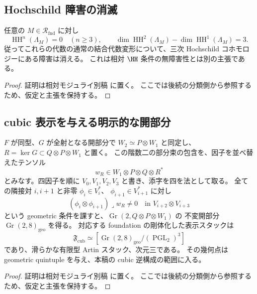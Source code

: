 \subsection{Hochschild 障害の消滅}

\begin{proposition}
\label{prop:foundation-hochschild}
任意の $M\in\mathcal R_{\mathrm{fnd}}$ に対し
\[
 \operatorname{HH}^n(\Lambda_M)=0\quad(n\ge3),\qquad
 \dim\operatorname{HH}^2(\Lambda_M)
 -\dim\operatorname{HH}^1(\Lambda_M)=3.
\]
従ってこれらの代数の通常の結合代数変形について、三次 Hochschild コホモロジーにある障害は消える。
これは相対 $\HH$ 条件の無障害性とは別の主張である。
\end{proposition}

\begin{proof}
証明は相対モジュライ別稿 \cite[\texttt{foundation_stack} 節]{QuadricModuli2026} に置く。
ここでは後続の分類側から参照するため、仮定と主張を保持する。
\end{proof}



\subsection{cubic 表示を与える明示的な開部分}

\begin{proposition}
\label{prop:cubic-foundation-open}
$F$ が同型、$G$ が全射となる開部分で $W_2\simeq P\otimes W_1$ と同定し、
$R=\ker G\subset Q\otimes P\otimes W_1$ と置く。
この階数二の部分束の包含を、因子を並べ替えたテンソル
\[
 w_R\in W_1\otimes P\otimes Q\otimes R^*
\]
とみなす。四因子を順に $V_0,V_1,V_2,V_3$ と書き、添字を四を法として取る。
全ての隣接対 $i,i+1$ と非零 $\phi_i\in V_i^*$、
$\phi_{i+1}\in V_{i+1}^*$ に対し
\[
 (\phi_i\otimes\phi_{i+1})\mathbin{\lrcorner}w_R\ne0
 \quad\text{in }V_{i+2}\otimes V_{i+3}
\]
という geometric 条件を課すと、$\operatorname{Gr}(2,Q\otimes P\otimes W_1)$ の
不変開部分 $\operatorname{Gr}(2,8)_{\mathrm{geo}}$ を得る。
対応する foundation の剛体化した表示スタックは
\[
 \mathfrak F_{\mathrm{cub}}
 \simeq[\operatorname{Gr}(2,8)_{\mathrm{geo}}/
         (\operatorname{PGL}_2)^3]
\]
であり、滑らかな有限型 Artin スタック、次元三である。
その幾何点は geometric quintuple を与え、本稿の cubic 逆構成の範囲に入る。
\end{proposition}
\begin{proof}
証明は相対モジュライ別稿 \cite[\texttt{foundation_stack} 節]{QuadricModuli2026} に置く。
ここでは後続の分類側から参照するため、仮定と主張を保持する。
\end{proof}

